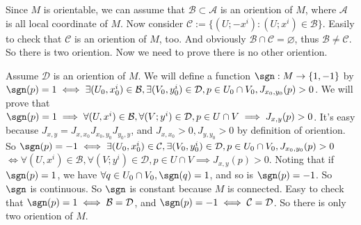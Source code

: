\documentclass{ctexart}
\begin{document}
\begin{solution}
  Since \(M\) is orientable, we can assume that \(\mathcal{B} \subset \mathcal{A}\) is an oriention of \(M\), where \(\mathcal{A}\) is all local coordinate of \(M\).
  Now consider \(\mathcal{C}:=\{(U;-x^i):(U;x^i) \in \mathcal{B}\}\). Easily to check that \(\mathcal{C}\) is an oriention of \(M\), too.
  And obviously \(\mathcal{B} \cap \mathcal{C} = \varnothing\), thus \(\mathcal{B} \neq \mathcal{C}\). So there is two oriention. Now we need to prove there is no other oriention.

  Assume \(\mathcal{D}\) is an oriention of \(M\). We will define a function \(\sgn:M \to \{1,-1\}\) by
  \(\sgn(p)=1 \iff \exists (U_0,x_0^i) \in \mathcal{B},\exists (V_0,y_0^i) \in \mathcal{D},p \in U_0 \cap V_0,J_{x_0,y_0}(p)>0\).
  We will prove that \(\sgn(p)=1 \implies \forall (U,x^i) \in \mathcal{B},\forall (V;y^i) \in \mathcal{D},p \in U \cap V \implies J_{x,y}(p)>0\).
  It's easy because \(J_{x,y}=J_{x,x_0}J_{x_0,y_0}J_{y_0,y}\), and \(J_{x,x_0}>0,J_{y,y_0}>0\) by definition of oriention.
  So \(\sgn(p)=-1 \iff \exists (U_0,x_0^i) \in \mathcal{C},\exists (V_0,y_0^i) \in \mathcal{D},p \in U_0 \cap V_0,J_{x_0,y_0}(p)>0 \)
  \(\iff \forall (U,x^i) \in \mathcal{B},\forall (V;y^i) \in \mathcal{D},p \in U \cap V \implies J_{x,y}(p)>0 \).
  Noting that if \(\sgn(p)=1\), we have \(\forall q \in U_0 \cap V_0,\sgn(q)=1\), and so is \(\sgn(p)=-1\).
  So \(\sgn\) is continuous. So \(\sgn\) is constant because \(M\) is connected.
  Easy to check that \(\sgn(p)=1 \iff \mathcal{B}=\mathcal{D}\), and \(\sgn(p)=-1 \iff \mathcal{C}=\mathcal{D}\).
  So there is only two oriention of \(M\).
\end{solution}
\end{document}
